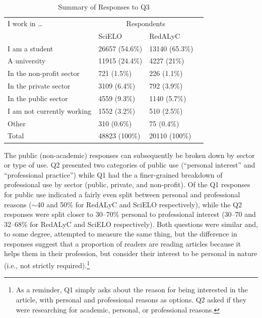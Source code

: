 \begin{table}[!htbp]
\centering
\caption{Summary of Responses to Q3} \label{q3_summary}
\begin{tabular}{@{}llll@{}}
\toprule
I work in …    &\multicolumn{2}{c}{Respondents} \\ \cmidrule{2-3}
    &   SciELO  &   RedALyC \\ \midrule
I am a student  &   26657 (54.6\%)   &   13140 (65.3\%)   \\
A university    &   11915 (24.4\%)   &   4227 (21\%)  \\
In the non-profit sector    &   721 (1.5\%)  &   226 (1.1\%)  \\
In the private sector   &   3109 (6.4\%) &   792 (3.9\%)  \\
In the public sector    &   4559 (9.3\%) &   1140 (5.7\%) \\
I am not currently working  &   1552 (3.2\%) &   510 (2.5\%)  \\
Other   &   310 (0.6\%)  &   75 (0.4\%)   \\ \midrule
Total   &   48823 (100\%)    &   20110 (100\%)    \\ \bottomrule
\end{tabular}
\end{table}


The public (non-academic) responses can subsequently be broken down by sector or type of use. Q2 presented two categories of public use (``personal interest'' and ``professional practice'') while Q1 had the a finer-grained breakdown of professional use by sector (public, private, and non-profit). Of the Q1 responses for public use indicated a fairly even split between personal and professional reasons (\ensuremath{\sim}40 and 50\% for RedALyC and SciELO respectively), while the Q2 responses were split closer to 30--70\% personal to professional interest (30--70 and 32--68\% for RedALyC and SciELO respectively). Both questions were similar and, to some degree, attempted to measure the same thing, but the difference in responses suggest that a proportion of readers are reading articles because it helps them in their profession, but consider their interest to be personal in nature (i.e., not strictly required).\footnote{As a reminder, Q1 simply asks about the reason for being interested in the article, with personal and professional reasons as options. Q2 asked if they were researching for academic, personal, or professional reasons.}

